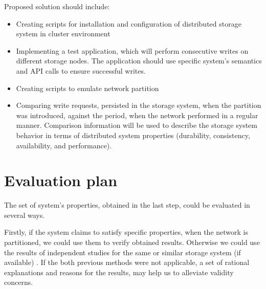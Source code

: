 \documentclass[a4paper]{article}
\begin{document}
Proposed solution should include:
\begin{itemize}
	\item Creating scripts for installation and configuration of distributed storage system in cluster environment
	\item Implementing a test application, which will perform consecutive writes on different storage nodes. 
		The application should use specific system's semantics and API calls to ensure successful writes.
	\item Creating scripts to emulate network partition  
	\item Comparing write requests, persisted in the storage system, when the partition was introduced, against the period, when the network performed in a regular manner. 
		Comparison information will be used to describe the storage system behavior in terms of distributed system properties (durability, consistency, availability, and performance).
\end{itemize}

\section*{Evaluation plan}

The set of system's properties, obtained in the last step, could be evaluated in several ways.

Firstly, if the system claims to satisfy specific properties, when the network is partitioned, we could use them to verify obtained results.
Otherwise we could use the results of independent studies for the same or similar storage system (if available)  \cite{jepsen}. 
If the both previous methods were not applicable, a set of rational explanations and reasons for the results, may help us to alleviate validity concerns. 

\printbibliography
\end{document}

